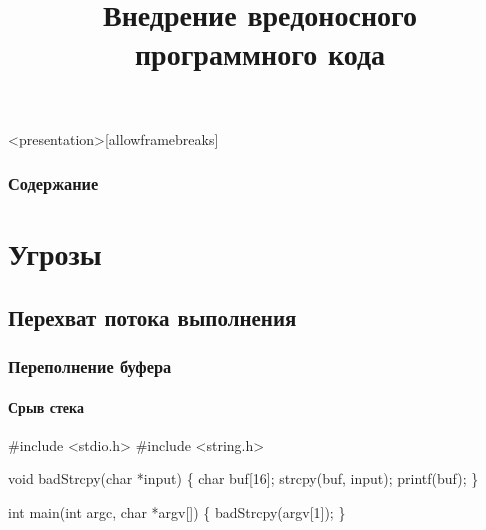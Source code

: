 


\title[Внедрение кода]{Внедрение вредоносного программного кода}




\begin{frame}<presentation>[allowframebreaks]
    \frametitle{Содержание}
    \tableofcontents
\end{frame}


\section{Угрозы}


\subsection{Перехват потока выполнения} 

\begin{frame}[fragile]
    \frametitle{Переполнение буфера}
    \framesubtitle{Срыв стека}
    
\begin{semiverbatim}
#include <stdio.h>
#include <string.h>

void badStrcpy(char *input) \{
    char buf[16];
    strcpy(buf, input);
    printf(buf);
\}

int main(int argc, char *argv[]) \{
    badStrcpy(argv[1]);
\}
\end{semiverbatim}
\end{frame}


